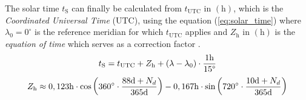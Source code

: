 The solar time $t_\mathrm{S}$ can finally be calculated from $t_\mathrm{UTC}$ in $\left(\mathrm h \right)$, which is the \emph{Coordinated Universal Time} (UTC), using the equation (\ref{eq:solar_time}) where $\lambda_0 = 0^\circ$ is the reference meridian for which $t_\mathrm{UTC}$ applies and $Z_{\mathrm{h}}$ in $\left(\mathrm{h}\right)$ is the \emph{equation of time} which serves as a correction factor  \cite{Karttunen:2006, Wagner:2018}.
	\begin{equation} \label{eq:solar_time}
	\centering
		t_\mathrm{S} = t_\mathrm{UTC} + Z_{\mathrm{h}} + \left(\lambda - \lambda_{\mathrm{0}}\right) \cdot \frac{1\mathrm{h}}{15\degree}
	\end{equation}
	\begin{equation} \label{eq:time_equation}
	\centering
		Z_{\mathrm{h}} \approx 0,123\mathrm{h} \cdot \cos \left(360^\circ \cdot \frac{88\mathrm{d} + N_d}{365\mathrm{d}}\right) - 0,167\mathrm{h} \cdot \sin \left(720^\circ \cdot \frac{10\mathrm{d} + N_d}{365\mathrm{d}}\right) 
	\end{equation}
